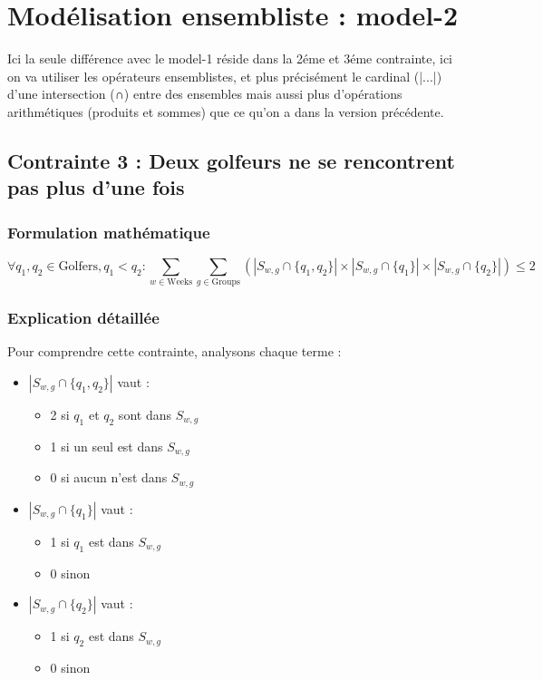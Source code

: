 \documentclass{article}
\begin{document}
\section*{Mod\'elisation ensembliste : model-2}

Ici la seule différence avec le model-1 réside dans la 2éme et 3éme contrainte, ici on va utiliser les opérateurs ensemblistes, et plus précisément le cardinal (|...|) d'une intersection (∩) entre des ensembles mais aussi plus d'opérations arithmétiques (produits et sommes) que ce qu'on a dans la version précédente.

\subsection*{Contrainte 3 : Deux golfeurs ne se rencontrent pas plus d'une fois}

\subsubsection*{Formulation mathématique}
\[
\forall q_1,q_2 \in \text{Golfers}, q_1 < q_2 : \sum_{w \in \text{Weeks}} \sum_{g \in \text{Groups}} (|S_{w,g} \cap \{q_1,q_2\}| \times |S_{w,g} \cap \{q_1\}| \times |S_{w,g} \cap \{q_2\}|) \leq 2
\]

\subsubsection*{Explication détaillée}
Pour comprendre cette contrainte, analysons chaque terme :

\begin{itemize}
   \item $|S_{w,g} \cap \{q_1,q_2\}|$ vaut :
   \begin{itemize}
       \item 2 si $q_1$ et $q_2$ sont dans $S_{w,g}$
       \item 1 si un seul est dans $S_{w,g}$
       \item 0 si aucun n'est dans $S_{w,g}$
   \end{itemize}
   
   \item $|S_{w,g} \cap \{q_1\}|$ vaut :
   \begin{itemize}
       \item 1 si $q_1$ est dans $S_{w,g}$
       \item 0 sinon
   \end{itemize}
   
   \item $|S_{w,g} \cap \{q_2\}|$ vaut :
   \begin{itemize}
       \item 1 si $q_2$ est dans $S_{w,g}$
       \item 0 sinon
   \end{itemize}
\end{itemize}
\end{document}
